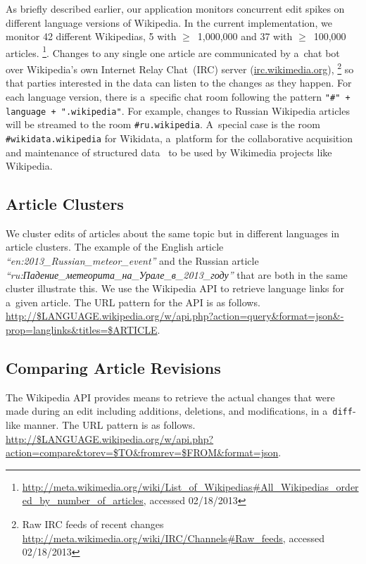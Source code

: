\documentclass{sig-alternate}
\newcommand{\inlinelistingsize}{\fontsize{8pt}{11pt}}
\let\oldurl\url
\renewcommand{\url}[1]{\inlinelistingsize\oldurl{#1}}
\begin{document}
As briefly described earlier, our application monitors concurrent edit spikes
on different language versions of Wikipedia.
In the current implementation, we monitor 42 different Wiki\-pedias, 5 with 
$\geq$~1,000,000 and 37 with $\geq$~100,000 articles.%
\footnote{\url{http://meta.wikimedia.org/wiki/List_of_Wikipedias\#All_Wikipedias_ordered_by_number_of_articles},
accessed 02/18/2013}.
Changes to any single one article are communicated by a~chat bot
over Wikipedia's own Internet Relay Chat~(IRC) server (\url{irc.wikimedia.org}),%
\footnote{Raw IRC feeds of recent changes \url{http://meta.wikimedia.org/wiki/IRC/Channels\#Raw_feeds}, accessed 02/18/2013}
so that parties interested in the data can listen to the changes as they happen.
For each language version, there is a~specific chat room following the pattern
\texttt{"\#" + language + ".wikipedia"}.
For example, changes to Russian Wikipedia articles will be streamed to the room
\texttt{\#ru.wikipedia}.
A~special case is the room \texttt{\#wikidata.wikipedia} for Wikidata,
a~platform for the collaborative acquisition and maintenance
of structured data~\cite{vrandecic2012wikidata} to be used by
Wikimedia projects like Wikipedia.

\subsection{Article Clusters}

We cluster edits of articles about the same topic but in different languages
in article clusters.
The example of the English article
\emph{``en:2013\_Russian\_meteor\_event''}
and the Russian article \selectfont
\emph{``ru:Падение\_метеорита\_на\_Урале\_в\_2013\_году''}
\selectfont that are both in the same cluster illustrate this.
We use the Wikipedia API to retrieve language links for a~given article.
The URL pattern for the API is as follows.
\url{http://$LANGUAGE.wikipedia.org/w/api.php?action=query&format=json&-prop=langlinks&titles=$ARTICLE}.


\subsection{Comparing Article Revisions}

The Wikipedia API provides means to retrieve the actual changes
that were made during an edit including additions, deletions,
and modifications, in a~\texttt{diff}-like manner.
The URL pattern is as follows.
\url{http://$LANGUAGE.wikipedia.org/w/api.php?action=compare&torev=$TO&fromrev=$FROM&format=json}.%
\end{document}
